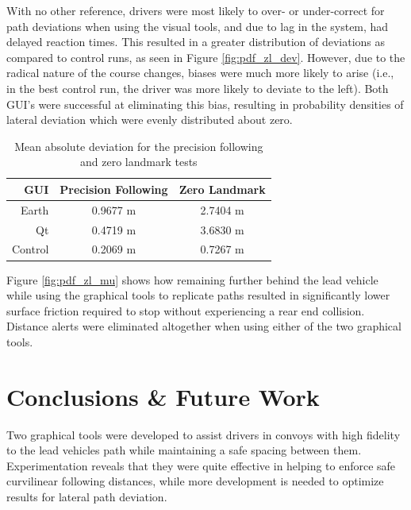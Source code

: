 \documentclass[twocolumn,10pt]{article}
\begin{document}
    With no other reference, drivers were most likely to over- or under-correct for path deviations when using the visual tools, and due to lag in the system, had delayed reaction times. This resulted in a greater distribution of deviations as compared to control runs, as seen in Figure \ref{fig:pdf_zl_dev}. However, due to the radical nature of the course changes, biases were much more likely to arise (i.e., in the best control run, the driver was more likely to deviate to the left). Both GUI's were successful at eliminating this bias, resulting in probability densities of lateral deviation which were evenly distributed about zero.



    \begin{table}[htbp] \centering
      \caption{Mean absolute deviation for the precision following and zero landmark tests}
      \begin{tabular}{r|c|c|} 
        GUI&         Precision Following & Zero Landmark \\
        \hline
        Earth&      0.9677 m & 2.7404 m \\
        Qt&         0.4719 m & 3.6830 m \\
        Control&    0.2069 m & 0.7267 m \\ \hline 
      \end{tabular}
      \label{tab:dev_mean}
    \end{table}
    
    Figure \ref{fig:pdf_zl_mu} shows how remaining further behind the lead vehicle while using the graphical tools to replicate paths resulted in significantly lower surface friction required to stop without experiencing a rear end collision. Distance alerts were eliminated altogether when using either of the two graphical tools.




\section*{Conclusions \& Future Work}

  Two graphical tools were developed to assist drivers in convoys with high fidelity to the lead vehicles path while maintaining a safe spacing between them.  Experimentation reveals that they were quite effective in helping to enforce safe curvilinear following distances, while more development is needed to optimize results for lateral path deviation.  
\end{document}
